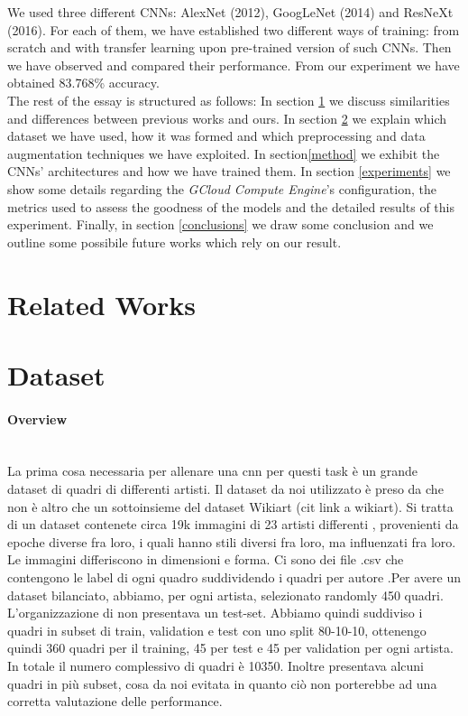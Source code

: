 \documentclass{article}
\begin{document}
We used three different CNNs: AlexNet (2012), GoogLeNet (2014) and ResNeXt (2016). For each of them, we have established two different ways of training: from scratch and with transfer learning  upon pre-trained version of such CNNs. Then we have observed and compared their performance. From our experiment we have obtained 83.768\% accuracy.\\

The rest of the essay is structured as follows: In section \ref{relwor} we discuss  similarities and differences between previous works and ours. In section \ref{dataset} we explain which dataset we have used, how it was formed and which preprocessing and data augmentation techniques we have exploited. In section\ref{method} we exhibit the CNNs' architectures and how we have trained them. In section \ref{experiments} we show some details regarding the \textit{GCloud Compute Engine}'s configuration, the metrics used to assess the goodness of the models and the detailed results of this experiment. Finally, in section \ref{conclusions} we draw some conclusion and we outline some possibile future works which rely on our result.


\section{Related Works}\label{relwor}


\section{Dataset}\label{dataset}

\paragraph{Overview}\mbox{}\\
La prima cosa necessaria per allenare una cnn per questi task è un grande dataset di quadri di differenti artisti. Il dataset da noi utilizzato è preso da \cite{ArtGANDataset} che non è altro che un sottoinsieme del dataset Wikiart (cit link a wikiart). Si tratta di un dataset contenete circa 19k immagini di 23 artisti differenti , provenienti da epoche diverse fra loro, i quali hanno stili diversi fra loro, ma influenzati fra loro. Le immagini differiscono in dimensioni e forma.  Ci sono dei file .csv che contengono le label di ogni quadro suddividendo i quadri per  autore .Per avere un dataset bilanciato, abbiamo, per ogni artista, selezionato randomly 450 quadri.
L'organizzazione di \cite{ArtGANDataset} non presentava un test-set. Abbiamo quindi suddiviso i quadri in subset di train, validation e test con uno split 80-10-10, ottenengo quindi 360 quadri per il training, 45 per test e 45 per validation per ogni artista. In totale il numero complessivo di quadri è 10350.
Inoltre \cite{ArtGANDataset} presentava alcuni quadri in più subset, cosa da noi evitata in quanto ciò non porterebbe ad una corretta valutazione delle performance.
\end{document}
